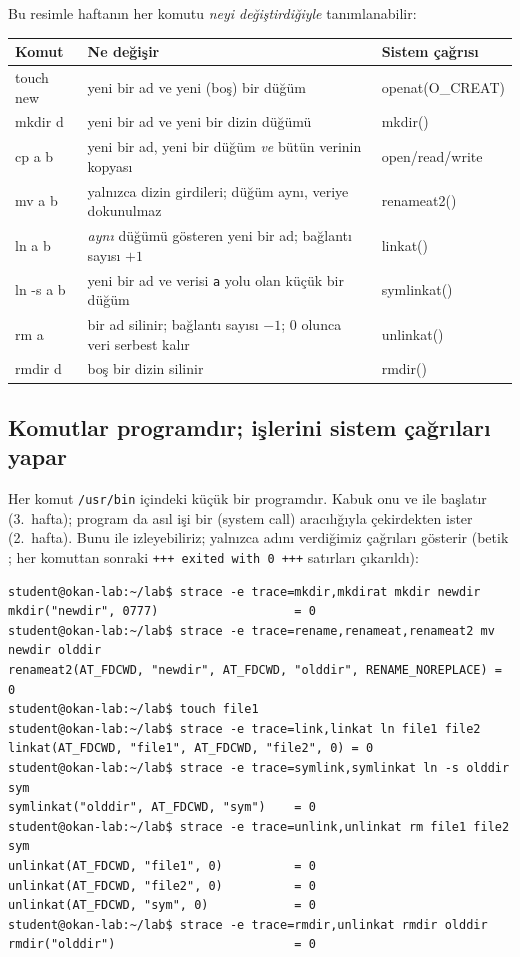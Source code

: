 Bu resimle haftanın her komutu \emph{neyi değiştirdiğiyle} tanımlanabilir:

\begin{center}
\renewcommand{\arraystretch}{1.25}
\begin{tabularx}{\linewidth}{>{\ttfamily}l >{\raggedright\arraybackslash}X >{\ttfamily}l}
\toprule
\textrm{\textbf{Komut}} & \textbf{Ne değişir} & \textrm{\textbf{Sistem çağrısı}} \\
\midrule
touch new & yeni bir ad ve yeni (boş) bir düğüm & openat(O\_CREAT) \\
mkdir d & yeni bir ad ve yeni bir dizin düğümü & mkdir() \\
cp a b & yeni bir ad, yeni bir düğüm \emph{ve} bütün verinin kopyası & open/read/write \\
mv a b & yalnızca dizin girdileri; düğüm aynı, veriye dokunulmaz & renameat2() \\
ln a b & \emph{aynı} düğümü gösteren yeni bir ad; bağlantı sayısı $+1$ & linkat() \\
ln -s a b & yeni bir ad ve verisi \texttt{a} yolu olan küçük bir düğüm & symlinkat() \\
rm a & bir ad silinir; bağlantı sayısı $-1$; $0$ olunca veri serbest kalır & unlinkat() \\
rmdir d & boş bir dizin silinir & rmdir() \\
\bottomrule
\end{tabularx}
\end{center}

\subsection{Komutlar programdır; işlerini sistem çağrıları yapar}

Her komut \texttt{/usr/bin} içindeki küçük bir programdır. Kabuk onu  ve  ile başlatır (3.~hafta); program da asıl işi bir  (system call) aracılığıyla çekirdekten ister (2.~hafta). Bunu  ile izleyebiliriz;  yalnızca adını verdiğimiz çağrıları gösterir (betik ; her komuttan sonraki \texttt{+++ exited with 0 +++} satırları çıkarıldı):

\begin{lstlisting}[style=term]
student@okan-lab:~/lab$ strace -e trace=mkdir,mkdirat mkdir newdir
mkdir("newdir", 0777)                   = 0
student@okan-lab:~/lab$ strace -e trace=rename,renameat,renameat2 mv newdir olddir
renameat2(AT_FDCWD, "newdir", AT_FDCWD, "olddir", RENAME_NOREPLACE) = 0
student@okan-lab:~/lab$ touch file1
student@okan-lab:~/lab$ strace -e trace=link,linkat ln file1 file2
linkat(AT_FDCWD, "file1", AT_FDCWD, "file2", 0) = 0
student@okan-lab:~/lab$ strace -e trace=symlink,symlinkat ln -s olddir sym
symlinkat("olddir", AT_FDCWD, "sym")    = 0
student@okan-lab:~/lab$ strace -e trace=unlink,unlinkat rm file1 file2 sym
unlinkat(AT_FDCWD, "file1", 0)          = 0
unlinkat(AT_FDCWD, "file2", 0)          = 0
unlinkat(AT_FDCWD, "sym", 0)            = 0
student@okan-lab:~/lab$ strace -e trace=rmdir,unlinkat rmdir olddir
rmdir("olddir")                         = 0
\end{lstlisting}


